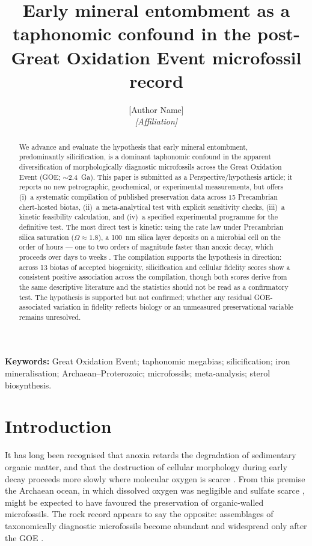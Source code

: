 \documentclass[11pt]{article}
\title{\vspace{-1.0cm}\textbf{Early mineral entombment as a taphonomic confound in the
post-Great Oxidation Event microfossil record}}
\author{[Author Name]\\
\small\textit{[Affiliation]}}
\date{}
\begin{document}
\maketitle

\begin{abstract}
\noindent We advance and evaluate the hypothesis that early mineral entombment, predominantly
silicification, is a dominant taphonomic confound in the apparent diversification of morphologically
diagnostic microfossils across the Great Oxidation Event (GOE; $\sim$2.4~Ga). This paper is submitted
as a Perspective/hypothesis article; it reports no new petrographic, geochemical, or experimental
measurements, but offers (i)~a systematic compilation of published preservation data across 15
Precambrian chert-hosted biotas, (ii)~a meta-analytical test with explicit sensitivity checks,
(iii)~a kinetic feasibility calculation, and (iv)~a specified experimental programme for the
definitive test. The most direct test is kinetic: using the \citet{Rimstidt1980} rate law under
Precambrian silica saturation ($\Omega \approx 1.8$), a 100~nm silica layer deposits on a microbial
cell on the order of hours --- one to two orders of magnitude faster than anoxic decay, which
proceeds over days to weeks \citep{TaxonRedox2025}. The compilation supports the hypothesis in
direction: across 13 biotas of accepted biogenicity, silicification and cellular fidelity scores
show a consistent positive association across the compilation, though both scores derive from the
same descriptive literature and the statistics should not be read as a confirmatory test. The
hypothesis is supported but not confirmed; whether any residual GOE-associated variation in fidelity
reflects biology or an unmeasured preservational variable remains unresolved.
\end{abstract}

\noindent\textbf{Keywords:} Great Oxidation Event; taphonomic megabias; silicification; iron
mineralisation; Archaean--Proterozoic; microfossils; meta-analysis; sterol biosynthesis.

\section{Introduction}

It has long been recognised that anoxia retards the degradation of sedimentary organic matter, and
that the destruction of cellular morphology during early decay proceeds more slowly where molecular
oxygen is scarce \citep{Canfield1994,Hedges1995}. From this premise the Archaean ocean, in which
dissolved oxygen was negligible \citep{Pavlov2002} and sulfate scarce \citep{Habicht2002,Crowe2014},
might be expected to have favoured the preservation of organic-walled microfossils. The rock record
appears to say the opposite: assemblages of taxonomically diagnostic microfossils become abundant
and widespread only after the GOE \citep{Javaux2018,Wacey2014}.
\end{document}
